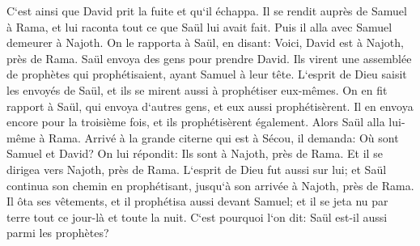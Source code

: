 \verse C`est ainsi que David prit la fuite et qu`il échappa. Il se rendit auprès de Samuel à Rama, et lui raconta tout ce que Saül lui avait fait. Puis il alla avec Samuel demeurer à Najoth. 
\verse On le rapporta à Saül, en disant: Voici, David est à Najoth, près de Rama. 
\verse Saül envoya des gens pour prendre David. Ils virent une assemblée de prophètes qui prophétisaient, ayant Samuel à leur tête. L`esprit de Dieu saisit les envoyés de Saül, et ils se mirent aussi à prophétiser eux-mêmes. 
\verse On en fit rapport à Saül, qui envoya d`autres gens, et eux aussi prophétisèrent. Il en envoya encore pour la troisième fois, et ils prophétisèrent également. 
\verse Alors Saül alla lui-même à Rama. Arrivé à la grande citerne qui est à Sécou, il demanda: Où sont Samuel et David? On lui répondit: Ils sont à Najoth, près de Rama. 
\verse Et il se dirigea vers Najoth, près de Rama. L`esprit de Dieu fut aussi sur lui; et Saül continua son chemin en prophétisant, jusqu`à son arrivée à Najoth, près de Rama. 
\verse Il ôta ses vêtements, et il prophétisa aussi devant Samuel; et il se jeta nu par terre tout ce jour-là et toute la nuit. C`est pourquoi l`on dit: Saül est-il aussi parmi les prophètes? 

\chapter{}


